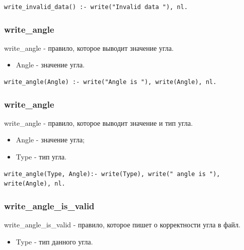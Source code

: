 \begin{lstlisting}[caption=Реализация правила write\_invalid\_data, label=rules:writeinvaliddata]
write_invalid_data() :- write("Invalid data "), nl.
\end{lstlisting}

\subsubsection{write\_angle}
\hspace{0.6cm} write\_angle - правило, которое выводит значение угла.

\begin{itemize}
	\item Angle - значение угла.
\end{itemize}

\begin{lstlisting}[caption=Реализация правила write\_angle, label=rules:writeangle]
write_angle(Angle) :- write("Angle is "), write(Angle), nl.
\end{lstlisting}

\subsubsection{write\_angle}
\hspace{0.6cm} write\_angle - правило, которое выводит значение и тип угла.

\begin{itemize}
	\item Angle - значение угла;
	\item Type - тип угла.
\end{itemize}

\begin{lstlisting}[caption=Реализация правила write\_angle, label=rules:writeangle]
write_angle(Type, Angle):- write(Type), write(" angle is "), write(Angle), nl.
\end{lstlisting}

\subsubsection{write\_angle\_is\_valid}
\hspace{0.6cm} write\_angle\_is\_valid - правило, которое пишет о корректности угла в файл.

\begin{itemize}
	\item Type - тип данного угла.
\end{itemize}

